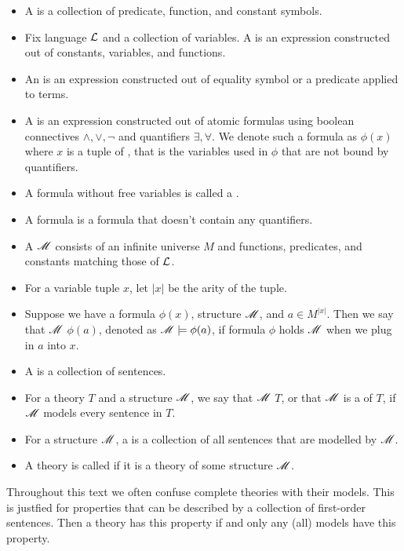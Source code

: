 \begin{Definition}
  \begin{itemize}
  \item A  is a collection of predicate, function, and constant symbols.
  \item Fix language $\mathcal L$ and a collection of variables.
    A  is an expression constructed out of constants, variables, and functions.
  \item An  is an expression constructed out of equality symbol or a predicate applied to terms.
  \item A  is an expression constructed out of atomic formulas using boolean connectives
    $\wedge, \vee, \neg$ and quantifiers $\exists, \forall$.
    We denote such a formula as $\phi(x)$ where $x$ is a tuple of ,
    that is the variables used in $\phi$ that are not bound by quantifiers.
  \item A formula without free variables is called a .
  \item A  formula is a formula that doesn't contain any quantifiers.
  \item A  $\mathscr M$ consists of an infinite universe $M$ and functions, predicates, and constants matching those of $\mathcal L$.
  \item For a variable tuple $x$, let $|x|$ be the arity of the tuple.
  \item Suppose we have a formula $\phi(x)$, structure $\mathscr M$, and $a \in M^{|x|}$.
    Then we say that $\mathscr M$  $\phi(a)$, denoted as $\mathscr M \models \phi(a)$,
    if formula $\phi$ holds $\mathscr M$ when we plug in $a$ into $x$.
  \item A  is a collection of sentences.
  \item For a theory $T$ and a structure $\mathscr M$, we say that $\mathscr M$  $T$,
    or that $\mathscr M$ is a  of $T$, if $\mathscr M$ models every sentence in $T$.
  \item For a structure $\mathscr M$, a  is a collection of all sentences that are modelled by $\mathscr M$.
  \item A theory is called  if it is a theory of some structure $\mathscr M$.
  \end{itemize}  
\end{Definition}

Throughout this text we often confuse complete theories with their models.
This is justfied for properties that can be described by a collection of first-order sentences.
Then a theory has this property if and only any (all) models have this property.

